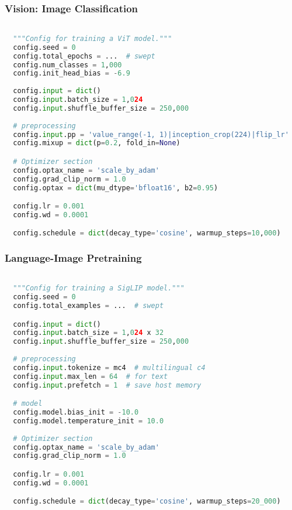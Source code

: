 \subsubsection{Vision: Image Classification}
\begin{lstlisting}[language=Python, style=mystyle]

  """Config for training a ViT model."""
  config.seed = 0
  config.total_epochs = ...  # swept
  config.num_classes = 1,000
  config.init_head_bias = -6.9
 
  config.input = dict()
  config.input.batch_size = 1,024
  config.input.shuffle_buffer_size = 250,000
  
  # preprocessing
  config.input.pp = 'value_range(-1, 1)|inception_crop(224)|flip_lr'
  config.mixup = dict(p=0.2, fold_in=None)

  # Optimizer section
  config.optax_name = 'scale_by_adam'
  config.grad_clip_norm = 1.0
  config.optax = dict(mu_dtype='bfloat16', b2=0.95)

  config.lr = 0.001
  config.wd = 0.0001

  config.schedule = dict(decay_type='cosine', warmup_steps=10,000)
\end{lstlisting}

\newpage
\subsubsection{Language-Image Pretraining}
\begin{lstlisting}[language=Python, style=mystyle]

  """Config for training a SigLIP model."""
  config.seed = 0
  config.total_examples = ...  # swept

  config.input = dict()
  config.input.batch_size = 1,024 x 32
  config.input.shuffle_buffer_size = 250,000
  
  # preprocessing
  config.input.tokenize = mc4  # multilingual c4
  config.input.max_len = 64  # for text
  config.input.prefetch = 1  # save host memory

  # model
  config.model.bias_init = -10.0
  config.model.temperature_init = 10.0
  
  # Optimizer section
  config.optax_name = 'scale_by_adam'
  config.grad_clip_norm = 1.0

  config.lr = 0.001
  config.wd = 0.0001

  config.schedule = dict(decay_type='cosine', warmup_steps=20_000)

\end{lstlisting}

